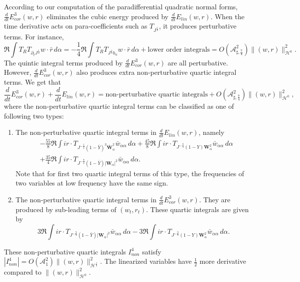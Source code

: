 \documentclass[10pt]{amsart}
\theoremstyle{remark}
\theoremstyle{definition}
\numberwithin{equation}{section}
\newcommand{\p}{\partial}
\renewcommand{\H}{{\mathcal H }}
\newcommand{\al}{\alpha}
\newcommand{\f}{\frac}
\newcommand{\bw}{\mathbf{W}}
\newcommand{\ASSharp}{{\mathcal{A}_{\sharp,\frac{7}{4}}^2}}
\begin{document}
According to our computation of the paradifferential quadratic normal forms, $\frac{d}{dt}E^3_{cor}(w,r)$ eliminates the cubic energy produced by $\frac{d}{dt}E_{lin}(w,r)$.
When the time derivative acts on para-coefficients such as $T_{J^\f14}$, it produces perturbative terms.
For instance, 
\begin{equation*}
    \Re \int  T_R T_{\p_t J^\f14}w\cdot\bar{r} \,d\al = -\f14 \Re \int  T_R T_{ J^\f14 b_\al}w\cdot\bar{r} \,d\al + \text{lower order integrals} =  O\left(\ASSharp \right) \|(w,r)\|_{\H^0}^2.
\end{equation*}
The quintic integral terms produced by $\frac{d}{dt}E^3_{cor}(w,r)$ are all perturbative.
However, $\frac{d}{dt}E^3_{cor}(w,r)$ also produces extra non-perturbative quartic integral terms.
We get that
\begin{equation*} 
 \frac{d}{dt}E^3_{cor}(w,r) +\frac{d}{dt}E_{lin}(w,r)= \text{non-perturbative quartic integrals} +  O\left(\ASSharp \right) \|(w,r)\|_{\H^0}^2,
\end{equation*}
where the non-perturbative quartic integral terms can be classified as one of following two types:
\begin{enumerate}
    \item The non-perturbative quartic integral terms in $\frac{d}{dt}E_{lin}(w,r)$, namely 
    \begin{align*}
    &- \f{55}{8}\Re \int ir \cdot T_{J^{-\f54}(1-\bar{Y})^3 \bar{\bw}_\al^2} \bar{w}_{\al \al} \,d\al   +\f{45}{8}\Re \int ir \cdot T_{J^{-\f94}(1-Y)\bw_\al^2} \bar{w}_{\al \al} \,d\al \\
 &+ \frac{35}{4}\Re \int i r \cdot T_{J^{-\f94}(1-\bar{Y})|\bw_\al|^2}\bar{w}_{\al \al}\,d\al.
    \end{align*}
    Note that for first two quartic integral terms of this type, the frequencies of two variables at low frequency have the same sign. 
    \item The non-perturbative quartic integral terms in $ \frac{d}{dt}E^3_{cor}(w,r)$.
    They are produced by sub-leading terms of $(w_t, r_t)$.
    These quartic integrals are given by 
    \begin{equation*}
     3\Re \int ir \cdot T_{J^{-\f94}(1-\bar{Y})|\bw_\al|^2}\bar{w}_{\al\al}\,d\al -3\Re \int ir \cdot T_{J^{-\f94}(1-Y)\bw_\al^2}\bar{w}_{\al \al }\,d\al.
    \end{equation*}
   \end{enumerate}
 These non-perturbative quartic integrals $I_{non}^4$ satisfy 
$|I_{non}^4| = O(\mathcal{A}_1^2) \| (w,r)\|_{\H^\f14}^2$.
The linearized variables have $\f12$ more derivative compared to $\| (w,r)\|_{\H^0}^2$.
\end{document}
